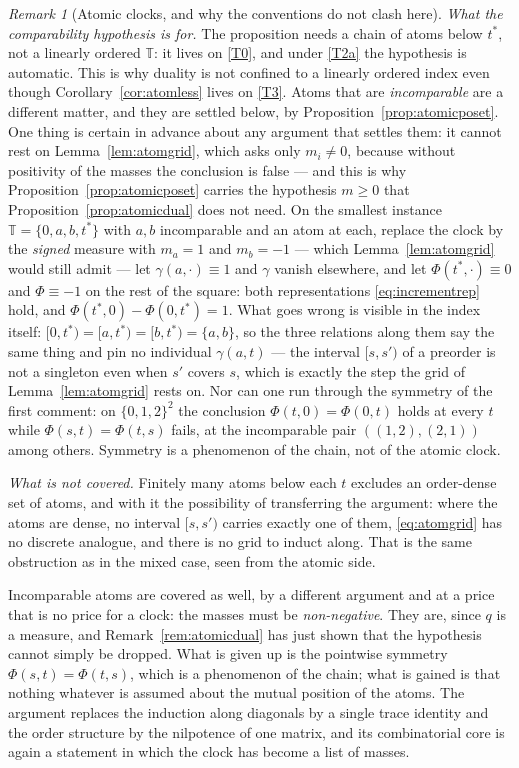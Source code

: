 \documentclass[11pt,a4paper]{article}
\theoremstyle{plain}
\theoremstyle{definition}
\theoremstyle{remark}
\newtheorem{remark}[theorem]{Remark}
\newcommand{\T}{\mathbb{T}}                     %
\begin{document}
\begin{remark}[Atomic clocks, and why the conventions do not clash here]
  \emph{What the comparability hypothesis is for.}  The proposition needs a chain
  of atoms below $t^*$, not a linearly ordered $\T$: it lives on \eqref{T0}, and
  under \eqref{T2a} the hypothesis is automatic.  This is why duality is not
  confined to a linearly ordered index even though
  Corollary~\ref{cor:atomless} lives on \eqref{T3}.  Atoms that are
  \emph{incomparable} are a different matter, and they are settled below, by
  Proposition~\ref{prop:atomicposet}.  One thing is certain in advance about any
  argument that settles them: it cannot rest on Lemma~\ref{lem:atomgrid}, which
  asks only $m_i \neq 0$, because without positivity of the masses the
  conclusion is false --- and this is why
  Proposition~\ref{prop:atomicposet} carries the hypothesis $m \geq 0$ that
  Proposition~\ref{prop:atomicdual} does not need.  On the smallest instance
  $\T = \{0,a,b,t^*\}$ with $a,b$ incomparable and an atom at each, replace the
  clock by the \emph{signed} measure with $m_a = 1$ and $m_b = -1$ --- which
  Lemma~\ref{lem:atomgrid} would still admit --- let
  $\gamma(a,\cdot) \equiv 1$ and $\gamma$ vanish
  elsewhere, and let $\Phi(t^*,\cdot) \equiv 0$ and $\Phi \equiv -1$ on the rest
  of the square: both representations \eqref{eq:incrementrep} hold, and
  $\Phi(t^*,0) - \Phi(0,t^*) = 1$.  What goes wrong is visible in the index
  itself: $[0,t^*) = [a,t^*) = [b,t^*) = \{a,b\}$, so the three relations along
  them say the same thing and pin no individual $\gamma(a,t)$ --- the interval
  $[s,s')$ of a preorder is not a singleton even when $s'$ covers $s$, which is
  exactly the step the grid of Lemma~\ref{lem:atomgrid} rests on.  Nor can one run through
  the symmetry of the first comment: on $\{0,1,2\}^2$ the conclusion
  $\Phi(t,0) = \Phi(0,t)$ holds at every $t$ while $\Phi(s,t) = \Phi(t,s)$ fails,
  at the incomparable pair $((1,2),(2,1))$ among others.  Symmetry is a
  phenomenon of the chain, not of the atomic clock.

  \emph{What is not covered.}  Finitely many atoms below each $t$ excludes an
  order-dense set of atoms, and with it the possibility of transferring the
  argument: where the atoms are dense, no interval $[s,s')$ carries exactly one
  of them, \eqref{eq:atomgrid} has no discrete analogue, and there is no grid to
  induct along.  That is the same obstruction as in the mixed case, seen from the
  atomic side.
\end{remark}

Incomparable atoms are covered as well, by a different argument and at a price
that is no price for a clock: the masses must be \emph{non-negative}.  They are,
since $q$ is a measure, and Remark~\ref{rem:atomicdual} has just shown that the
hypothesis cannot simply be dropped.  What is given up is the pointwise symmetry
$\Phi(s,t) = \Phi(t,s)$, which is a phenomenon of the chain; what is gained is
that nothing whatever is assumed about the mutual position of the atoms.  The
argument replaces the induction along diagonals by a single trace identity and
the order structure by the nilpotence of one matrix, and its combinatorial core
is again a statement in which the clock has become a list of masses.
\end{document}
